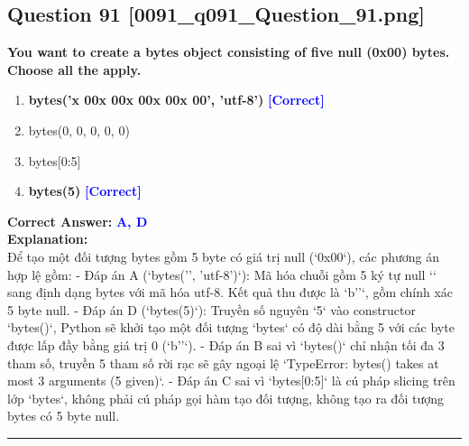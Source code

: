 \documentclass[11pt,a4paper]{article}
\begin{document}
\begin{minipage}{\textwidth}
\subsection*{Question 91 \quad \footnotesize{[0091_q091_Question_91.png]}}
\noindent \textbf{You want to create a bytes object consisting of five null (0x00) bytes. Choose all the apply.}

\begin{enumerate}[label=\Alph*.]
    \item \textbf{bytes('x 00x 00x 00x 00x 00', 'utf-8')} \hfill \textcolor{blue}{\textbf{[Correct]}}
    \item bytes(0, 0, 0, 0, 0)
    \item bytes[0:5]
    \item \textbf{bytes(5)} \hfill \textcolor{blue}{\textbf{[Correct]}}
\end{enumerate}

\noindent \textbf{Correct Answer:} \textcolor{blue}{\textbf{A, D}} \\[4pt]
\noindent \textbf{Explanation:}\\
Để tạo một đối tượng bytes gồm 5 byte có giá trị null (`0x00`), các phương án hợp lệ gồm:\newline
- Đáp án A (`bytes('', 'utf-8')`): Mã hóa chuỗi gồm 5 ký tự null `` sang định dạng bytes với mã hóa utf-8. Kết quả thu được là `b''`, gồm chính xác 5 byte null.\newline
- Đáp án D (`bytes(5)`): Truyền số nguyên `5` vào constructor `bytes()`, Python sẽ khởi tạo một đối tượng `bytes` có độ dài bằng 5 với các byte được lấp đầy bằng giá trị 0 (`b''`).\newline
- Đáp án B sai vì `bytes()` chỉ nhận tối đa 3 tham số, truyền 5 tham số rời rạc sẽ gây ngoại lệ `TypeError: bytes() takes at most 3 arguments (5 given)`.\newline
- Đáp án C sai vì `bytes[0:5]` là cú pháp slicing trên lớp `bytes`, không phải cú pháp gọi hàm tạo đối tượng, không tạo ra đối tượng bytes có 5 byte null.
\end{minipage}
\vspace{0.8cm}
\hrule
\vspace{0.5cm}
\end{document}
